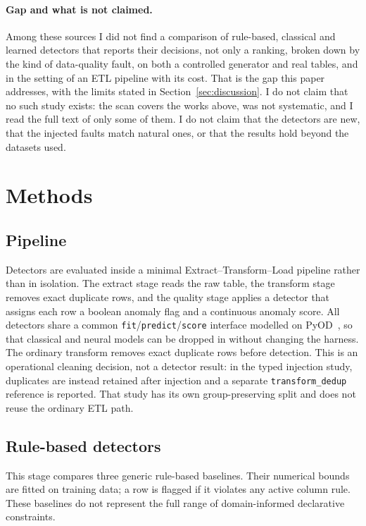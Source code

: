 \documentclass[conference]{IEEEtran}
\begin{document}
\paragraph{Gap and what is not claimed.}
Among these sources I did not find a comparison of rule-based, classical and
learned detectors that reports their decisions, not only a ranking, broken
down by the kind of data-quality fault, on both a controlled generator and
real tables, and in the setting of an ETL pipeline with its cost. That is the
gap this paper addresses, with the limits stated in Section~\ref{sec:discussion}.
I do not claim that no such study exists: the scan covers the works above, was
not systematic, and I read the full text of only some of them. I do not claim
that the detectors are new, that the injected faults match natural ones, or that
the results hold beyond the datasets used.

\section{Methods}
\label{sec:methodology}

\subsection{Pipeline}
Detectors are evaluated inside a minimal Extract--Transform--Load
pipeline rather than in isolation. The extract stage reads the raw table,
the transform stage removes exact duplicate rows, and the quality stage
applies a detector that assigns each row a boolean anomaly flag and a
continuous anomaly score. All detectors share a common
\texttt{fit}/\texttt{predict}/\texttt{score} interface modelled on
PyOD~\cite{zhao2019pyod}, so that classical and neural models can be
dropped in without changing the harness.
The ordinary transform removes exact duplicate rows before detection. This
is an operational cleaning decision, not a detector result: in the typed
injection study, duplicates are instead retained after injection and a
separate \texttt{transform\_dedup} reference is reported. That study has its
own group-preserving split and does not reuse the ordinary ETL path.

\subsection{Rule-based detectors}
This stage compares three generic rule-based baselines. Their numerical
bounds are fitted on training data; a row is flagged if it violates any
active column rule. These baselines do not represent the full range of
domain-informed declarative constraints.
\end{document}
